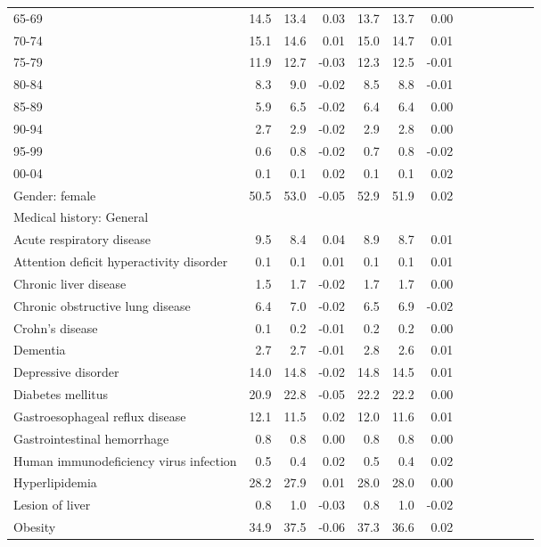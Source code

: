 \documentclass[11pt,]{article}
\begin{document}
\begin{longtable}{lrrrrrrrrrrrr}
      65-69 & 14.5 & 13.4 &  0.03 & 13.7 & 13.7 &  0.00 \\ 
      70-74 & 15.1 & 14.6 &  0.01 & 15.0 & 14.7 &  0.01 \\ 
      75-79 & 11.9 & 12.7 & -0.03 & 12.3 & 12.5 & -0.01 \\ 
      80-84 &  8.3 &  9.0 & -0.02 &  8.5 &  8.8 & -0.01 \\ 
      85-89 &  5.9 &  6.5 & -0.02 &  6.4 &  6.4 &  0.00 \\ 
      90-94 &  2.7 &  2.9 & -0.02 &  2.9 &  2.8 &  0.00 \\ 
      95-99 &  0.6 &  0.8 & -0.02 &  0.7 &  0.8 & -0.02 \\ 
      00-04 &  0.1 &  0.1 &  0.02 &  0.1 &  0.1 &  0.02 \\ 
  Gender: female & 50.5 & 53.0 & -0.05 & 52.9 & 51.9 &  0.02 \\ 
  Medical history: General &    &    &     &    &    &     \\ 
      Acute respiratory disease &  9.5 &  8.4 &  0.04 &  8.9 &  8.7 &  0.01 \\ 
      Attention deficit hyperactivity disorder &  0.1 &  0.1 &  0.01 &  0.1 &  0.1 &  0.01 \\ 
      Chronic liver disease &  1.5 &  1.7 & -0.02 &  1.7 &  1.7 &  0.00 \\ 
      Chronic obstructive lung disease &  6.4 &  7.0 & -0.02 &  6.5 &  6.9 & -0.02 \\ 
      Crohn's disease &  0.1 &  0.2 & -0.01 &  0.2 &  0.2 &  0.00 \\ 
      Dementia &  2.7 &  2.7 & -0.01 &  2.8 &  2.6 &  0.01 \\ 
      Depressive disorder & 14.0 & 14.8 & -0.02 & 14.8 & 14.5 &  0.01 \\ 
      Diabetes mellitus & 20.9 & 22.8 & -0.05 & 22.2 & 22.2 &  0.00 \\ 
      Gastroesophageal reflux disease & 12.1 & 11.5 &  0.02 & 12.0 & 11.6 &  0.01 \\ 
      Gastrointestinal hemorrhage &  0.8 &  0.8 &  0.00 &  0.8 &  0.8 &  0.00 \\ 
      Human immunodeficiency virus infection &  0.5 &  0.4 &  0.02 &  0.5 &  0.4 &  0.02 \\ 
      Hyperlipidemia & 28.2 & 27.9 &  0.01 & 28.0 & 28.0 &  0.00 \\ 
      Lesion of liver &  0.8 &  1.0 & -0.03 &  0.8 &  1.0 & -0.02 \\ 
      Obesity & 34.9 & 37.5 & -0.06 & 37.3 & 36.6 &  0.02 \\ 

\end{longtable}
\end{document}
